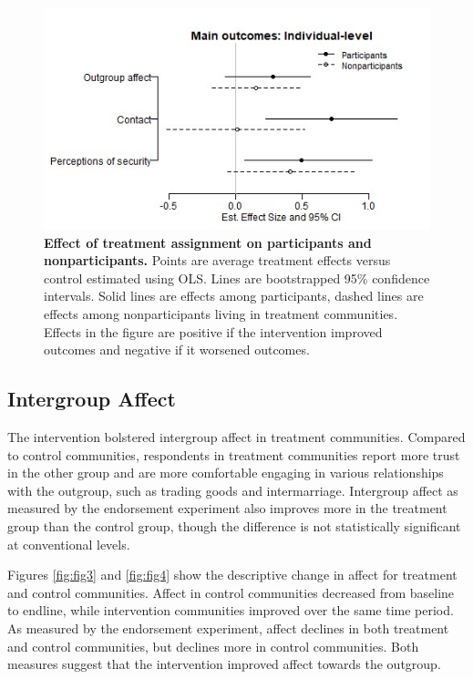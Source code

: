 \documentclass[11pt]{article}
\begin{document}
\begin{figure}[H]
\centering
\includegraphics[width=.7\textwidth]{../../../figs/ecpn_coefplots_MainOuts_panel-cats2.jpg}
\caption{\label{fig:fig2} \textbf{Effect of treatment assignment on participants and nonparticipants.} Points are average treatment effects versus control estimated using OLS. Lines are bootstrapped 95\% confidence intervals.  Solid lines are effects among participants, dashed lines are effects among nonparticipants living in treatment communities.  Effects in the figure are positive if the intervention improved outcomes and negative if it worsened outcomes.}
\end{figure}

\hypertarget{intergroup-affect}{%
\subsection{Intergroup Affect}\label{intergroup-affect}}

The intervention bolstered intergroup affect in treatment communities.
Compared to control communities, respondents in treatment communities
report more trust in the other group and are more comfortable engaging
in various relationships with the outgroup, such as trading goods and
intermarriage. Intergroup affect as measured by the endorsement
experiment also improves more in the treatment group than the control
group, though the difference is not statistically significant at
conventional levels.

Figures \ref{fig:fig3} and \ref{fig:fig4} show the descriptive change in
affect for treatment and control communities. Affect in control
communities decreased from baseline to endline, while intervention
communities improved over the same time period. As measured by the
endorsement experiment, affect declines in both treatment and control
communities, but declines more in control communities. Both measures
suggest that the intervention improved affect towards the outgroup.
\end{document}
